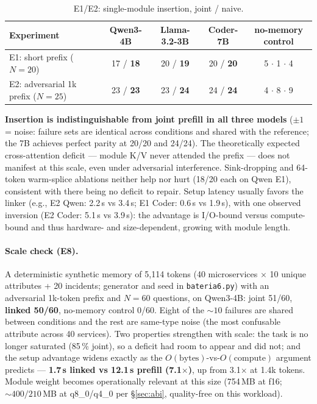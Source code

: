 \documentclass[11pt]{article}
\newcommand{\code}[1]{\texttt{#1}}
\begin{document}
\begin{table}[h]
  \centering\small
  \caption{E1/E2: single-module insertion, joint / naive.}
  \begin{tabular}{lcccc}
    \toprule
    Experiment & Qwen3-4B & Llama-3.2-3B & Coder-7B & no-memory control \\
    \midrule
    E1: short prefix ($N{=}20$) & 17 / \textbf{18} & 20 / \textbf{19} & 20 / \textbf{20} & 5 $\cdot$ 1 $\cdot$ 4 \\
    E2: adversarial 1k prefix ($N{=}25$) & 23 / \textbf{23} & 23 / \textbf{24} & 24 / \textbf{24} & 4 $\cdot$ 8 $\cdot$ 9 \\
    \bottomrule
  \end{tabular}
\end{table}

\textbf{Insertion is indistinguishable from joint prefill in all three models} ($\pm 1$ = noise: failure sets are identical across conditions and shared with the reference; the 7B achieves perfect parity at 20/20 and 24/24). The theoretically expected cross-attention deficit --- module K/V never attended the prefix --- does not manifest at this scale, even under adversarial interference. Sink-dropping and 64-token warm-splice ablations neither help nor hurt (18/20 each on Qwen E1), consistent with there being no deficit to repair. Setup latency usually favors the linker (e.g., E2 Qwen: 2.2\,s vs 3.4\,s; E1 Coder: 0.6\,s vs 1.9\,s), with one observed inversion (E2 Coder: 5.1\,s vs 3.9\,s): the advantage is I/O-bound versus compute-bound and thus hardware- and size-dependent, growing with module length.

\paragraph{Scale check (E8).}
A deterministic synthetic memory of 5{,}114 tokens (40 microservices $\times$ 10 unique attributes + 20 incidents; generator and seed in \code{bateria6.py}) with an adversarial 1k-token prefix and \textbf{$N{=}60$} questions, on Qwen3-4B: joint 51/60, \textbf{linked 50/60}, no-memory control 0/60. Eight of the ${\sim}10$ failures are shared between conditions and the rest are same-type noise (the most confusable attribute across 40 services). Two properties strengthen with scale: the task is no longer saturated (85\,\% joint), so a deficit had room to appear and did not; and the setup advantage widens exactly as the $O(\text{bytes})$-vs-$O(\text{compute})$ argument predicts --- \textbf{1.7\,s linked vs 12.1\,s prefill (7.1$\times$)}, up from 3.1$\times$ at 1.4k tokens. Module weight becomes operationally relevant at this size (754\,MB at f16; ${\sim}400/210$\,MB at q8\_0/q4\_0 per \S\ref{sec:abi}, quality-free on this workload).
\end{document}

